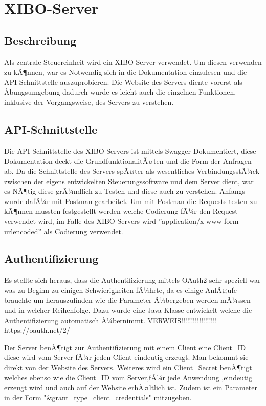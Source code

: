 \chapter{XIBO-Server}
\section{Beschreibung}
Als zentrale Steuereinheit wird ein XIBO-Server verwendet. Um diesen verwenden zu kÃ¶nnen, war es Notwendig sich in die Dokumentation einzulesen und die API-Schnittstelle auszuprobieren. Die Website des Servers diente vorerst als Ãbungsumgebung dadurch wurde es leicht auch die einzelnen Funktionen, inklusive der Vorgangsweise, des Servers zu verstehen.

\section{API-Schnittstelle}
Die API-Schnittstelle des XIBO-Servers ist mittels Swagger Dokumentiert, diese Dokumentation deckt die GrundfunktionalitÃ¤ten und die Form der Anfragen ab. Da die Schnittstelle des Servers spÃ¤ter als wesentliches VerbindungsstÃ¼ck zwischen der eigens entwickelten Steuerungssoftware und dem Server dient, war es NÃ¶tig diese grÃ¼ndlich zu Testen und diese auch zu verstehen. Anfangs wurde dafÃ¼r mit Postman gearbeitet. Um mit Postman die Requests testen zu kÃ¶nnen mussten festgestellt werden welche Codierung fÃ¼r den Request verwendet wird, im Falle des XIBO-Servers wird ''application/x-www-form-urlencoded'' als Codierung verwendet.


\section{Authentifizierung}
Es stellte sich heraus, dass die Authentifizierung mittels OAuth2 sehr speziell war was zu Beginn zu einigen Schwierigkeiten fÃ¼hrte, da es einige AnlÃ¤ufe brauchte um herauszufinden wie die Parameter Ã¼bergeben werden mÃ¼ssen und in welcher Reihenfolge. Dazu wurde eine Java-Klasse entwickelt welche die Authentifizierung automatisch Ã¼bernimmt.
VERWEIS!!!!!!!!!!!!!!!!!!
https://oauth.net/2/

Der Server benÃ¶tigt zur Authentifizierung mit einem Client eine Client_ID diese wird vom Server fÃ¼r jeden Client eindeutig erzeugt. Man bekommt sie direkt von der Website des Servers. 
Weiteres wird ein Client_Secret benÃ¶tigt welches ebenso wie die Client_ID vom Server,fÃ¼r jede Anwendung ,eindeutig erzeugt wird und auch auf der Website erhÃ¤ltlich ist. Zudem ist ein Parameter in der Form "&grant_type=client_credentials" mitzugeben.

